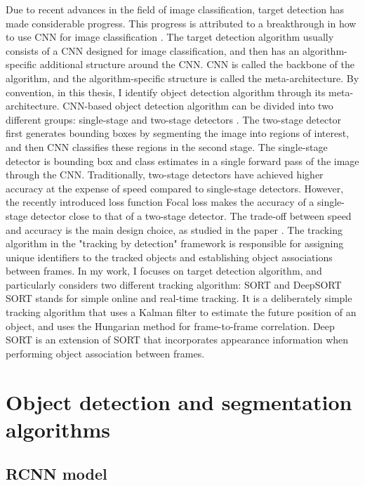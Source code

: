 Due to recent advances in the field of image classification, target detection has made considerable progress. This progress is attributed to a breakthrough in how to use CNN for image classification \cite{10.1145/3065386}. The target detection algorithm usually consists of a CNN designed for image classification, and then has an algorithm-specific additional structure around the CNN. CNN is called the backbone of the algorithm, and the algorithm-specific structure is called the meta-architecture. By convention, in this thesis, I identify object detection algorithm through its meta-architecture. CNN-based object detection algorithm can be divided into two different groups: single-stage and two-stage detectors \cite{DBLP:journals/corr/abs-1808-07256}. The two-stage detector first generates bounding boxes by segmenting the image into regions of interest, and then CNN classifies these regions in the second stage. The single-stage detector is bounding box and class estimates in a single forward pass of the image through the CNN. Traditionally, two-stage detectors have achieved higher accuracy at the expense of speed compared to single-stage detectors. However, the recently introduced loss function Focal loss \cite{DBLP:journals/corr/abs-1708-02002} makes the accuracy of a single-stage detector close to that of a two-stage detector. The trade-off between speed and accuracy is the main design choice, as studied in the paper \cite{DBLP:journals/corr/HuangRSZKFFWSG016}.
The tracking algorithm in the "tracking by detection" framework is responsible for assigning unique identifiers to the tracked objects and establishing object associations between frames. In my work, I focuses on target detection algorithm, and particularly considers two different tracking algorithm: SORT and DeepSORT SORT stands for simple online and real-time tracking. It is a deliberately simple tracking algorithm that uses a Kalman filter \cite{10.1115/1.3662552} to estimate the future position of an object, and uses the Hungarian method \cite{doi:10.1002/nav.3800020109} for frame-to-frame correlation. Deep SORT is an extension of SORT that incorporates appearance information when performing object association between frames.
\section{Object detection and segmentation algorithms}
\subsection{RCNN model}
